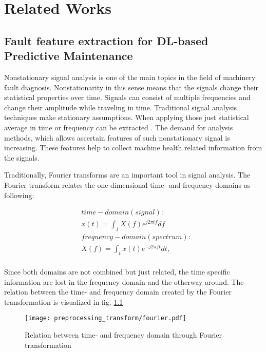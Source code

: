 
\chapter{Related Works}\label{chapter:related_works}


\section{Fault feature extraction for DL-based Predictive Maintenance}

Nonstationary signal analysis is one of the main topics in the field of machinery fault diagnosis. Nonstationarity in this sense means that the signals change their statistical properties over time. Signals can consist of multiple frequencies and change their amplitude while traveling in time. Traditional signal analysis techniques make stationary assumptions. When applying those just statistical average in time or frequency can be extracted \cite{FENG2013}. The demand for analysis methods, which allows ascertain features of such nonstationary signal is increasing. These features help to collect machine health related information from the signals.

Traditionally, Fourier transforms are an important tool in signal analysis. The Fourier transform relates the one-dimensional time- and frequency domains as following:

\begin{equation}
    \begin{aligned}
        & time-domain (signal): \\
        & x(t) = \int_{f} X(f) e^{j 2 \pi t f} df \\
        & frequency-domain (spectrum): \\
        & X(f) = \int_{t} x(t) e^{- j 2 \pi f t} dt, \\
    \end{aligned}
\end{equation}

Since both domains are not combined but just related, the time specific information are lost in the frequency domain and the otherway around. The relation between the time- and frequency domain created by the Fourier transformation is visualized in fig. \ref{fig:fourier} 
\begin{figure}[p]
  \centering
  \texttt{[image: preprocessing\_transform/fourier.pdf]}
  \caption{Relation between time- and frequency domain through Fourier transformation}
  \label{fig:fourier}
\end{figure}

